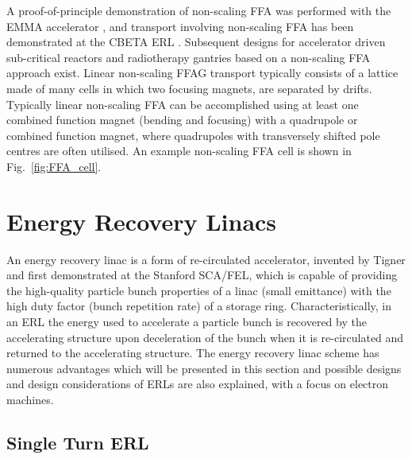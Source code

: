\documentclass[../main.tex]{subfiles}
\begin{document}
A proof-of-principle demonstration of non-scaling FFA was performed with the EMMA accelerator \cite{barlow2010emma,machida2012acceleration}, and transport involving non-scaling FFA has been demonstrated at the CBETA ERL \cite{hoffstaetter2017cbeta,bartnik2020cbeta}. Subsequent designs for accelerator driven sub-critical reactors \cite{tygier2011high} and radiotherapy gantries \cite{trbojevic2009ffags} based on a non-scaling FFA approach exist. Linear non-scaling FFAG transport typically consists of a lattice made of many cells in which two focusing magnets, are separated by drifts. Typically linear non-scaling FFA can be accomplished using at least one combined function magnet (bending and focusing) with a quadrupole or combined function magnet, where quadrupoles with transversely shifted pole centres are often utilised. An example non-scaling FFA cell is shown in Fig.~\ref{fig:FFA_cell}.

\section{Energy Recovery Linacs}
\label{sec:ERL_theory}

An energy recovery linac is a form of re-circulated accelerator, invented by Tigner \cite{tigner1965possible} and first demonstrated at the Stanford SCA/FEL\cite{smith1987development}, which is capable of providing the high-quality particle bunch properties of a linac (small emittance) with the high duty factor (bunch repetition rate) of a storage ring. Characteristically, in an ERL the energy used to accelerate a particle bunch is recovered by the accelerating structure upon deceleration of the bunch when it is re-circulated and returned to the accelerating structure. The energy recovery linac scheme has numerous advantages which will be presented in this section and possible designs and design considerations of ERLs are also explained, with a focus on electron machines. 

\subsection{Single Turn ERL}
\label{sec:single_turn_ERL}
\end{document}
